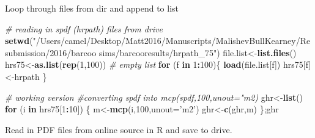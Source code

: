 \documentclass[10,portrait]{article}
\newenvironment{Shaded}{\begin{snugshade}}{\end{snugshade}}
\newcommand{\KeywordTok}[1]{\textcolor[rgb]{0.13,0.29,0.53}{\textbf{#1}}}
\newcommand{\DataTypeTok}[1]{\textcolor[rgb]{0.13,0.29,0.53}{#1}}
\newcommand{\DecValTok}[1]{\textcolor[rgb]{0.00,0.00,0.81}{#1}}
\newcommand{\StringTok}[1]{\textcolor[rgb]{0.31,0.60,0.02}{#1}}
\newcommand{\CommentTok}[1]{\textcolor[rgb]{0.56,0.35,0.01}{\textit{#1}}}
\newcommand{\ControlFlowTok}[1]{\textcolor[rgb]{0.13,0.29,0.53}{\textbf{#1}}}
\newcommand{\OperatorTok}[1]{\textcolor[rgb]{0.81,0.36,0.00}{\textbf{#1}}}
\newcommand{\NormalTok}[1]{#1}
\begin{document}
Loop through files from dir and append to list

\begin{Shaded}
\begin{Highlighting}[]
\CommentTok{# reading in spdf (hrpath) files from drive}
\KeywordTok{setwd}\NormalTok{(}\StringTok{"/Users/camel/Desktop/Matt2016/Manuscripts/MalishevBullKearney/Resubmission/2016/barcoo sims/barcooresults/hrpath_75"}\NormalTok{)}
\NormalTok{file.list<-}\KeywordTok{list.files}\NormalTok{()}
\NormalTok{hrs75<-}\KeywordTok{as.list}\NormalTok{(}\KeywordTok{rep}\NormalTok{(}\DecValTok{1}\NormalTok{,}\DecValTok{100}\NormalTok{)) }\CommentTok{# empty list}
\ControlFlowTok{for}\NormalTok{ (f }\ControlFlowTok{in} \DecValTok{1}\OperatorTok{:}\DecValTok{100}\NormalTok{)\{}
  \KeywordTok{load}\NormalTok{(file.list[f])}
\NormalTok{  hrs75[f]<-hrpath}
\NormalTok{\}}

\CommentTok{# working version}
\CommentTok{#converting spdf into mcp(spdf,100,unout="m2)}
\NormalTok{ghr<-}\KeywordTok{list}\NormalTok{()}
\ControlFlowTok{for}\NormalTok{ (i }\ControlFlowTok{in}\NormalTok{ hrs75[}\DecValTok{1}\OperatorTok{:}\DecValTok{10}\NormalTok{]) \{}
\NormalTok{  m<-}\KeywordTok{mcp}\NormalTok{(i,}\DecValTok{100}\NormalTok{,}\DataTypeTok{unout=}\StringTok{'m2'}\NormalTok{)}
\NormalTok{  ghr<-}\KeywordTok{c}\NormalTok{(ghr,m)}
\NormalTok{\};ghr}
\end{Highlighting}
\end{Shaded}

Read in PDF files from online source in R and save to drive.
\end{document}
